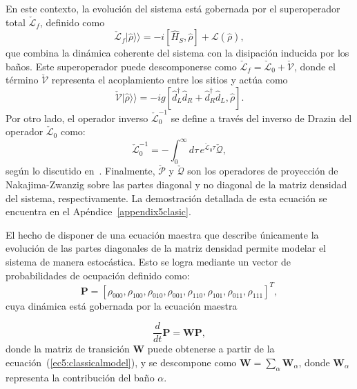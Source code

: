 En este contexto, la evolución del sistema está gobernada por el superoperador total $\check{\mathcal{L}}_{f}$, definido como
\begin{equation*}
\check{\mathcal{L}}_{f}|\hat{\rho}\rangle\rangle = -i[\hat{H}_{S}, \hat{\rho}] + \mathcal{L}(\hat{\rho}),
\end{equation*}
que combina la dinámica coherente del sistema con la disipación inducida por los baños. Este superoperador puede descomponerse como $\check{\mathcal{L}}_{f} = \check{\mathcal{L}}_{0} + \check{\mathcal{V}}$, donde el término $\check{\mathcal{V}}$ representa el acoplamiento entre los sitios y actúa como
\begin{equation*}
\check{\mathcal{V}}|\hat{\rho}\rangle\rangle = -ig[\hat{d}_{L}^{\dagger} \hat{d}_{R} + \hat{d}_{R}^{\dagger} \hat{d}_{L}, \hat{\rho}].
\end{equation*}
Por otro lado, el operador inverso $\check{\mathcal{L}}_{0}^{-1}$ se define a través del inverso de Drazin del operador $\check{\mathcal{L}}_{0}$ como:
\begin{equation*}
\check{\mathcal{L}}_{0}^{-1} = -\int_{0}^{\infty} d\tau\, e^{\check{\mathcal{L}}_{0} \tau} \check{\mathcal{Q}},
\end{equation*}
según lo discutido en~\cite{landi2024current}. Finalmente, $\check{\mathcal{P}}$ y $\check{\mathcal{Q}}$ son los operadores de proyección de Nakajima-Zwanzig sobre las partes diagonal y no diagonal de la matriz densidad del sistema, respectivamente. La demostración detallada de esta ecuación se encuentra en el Apéndice~\ref{appendix5clasic}.

El hecho de disponer de una ecuación maestra que describe únicamente la evolución de las partes diagonales de la matriz densidad permite modelar el sistema de manera estocástica. Esto se logra mediante un vector de probabilidades de ocupación definido como:
\begin{equation*}
\mathbf{P} = [\rho_{000}, \rho_{100}, \rho_{010}, \rho_{001}, \rho_{110}, \rho_{101}, \rho_{011}, \rho_{111}]^{T},
\end{equation*}
cuya dinámica está gobernada por la ecuación maestra

\begin{equation}
    \frac{d}{dt}\textbf{P} = \textbf{W}\textbf{P},
    \label{sec5:classicsemi}
\end{equation}
donde la matriz de transición $\mathbf{W}$ puede obtenerse a partir de la ecuación~(\ref{ec5:classicalmodel}), y se descompone como $\mathbf{W} = \sum_{\alpha} \mathbf{W}_{\alpha}$, donde $\mathbf{W}_{\alpha}$ representa la contribución del baño $\alpha$. 

